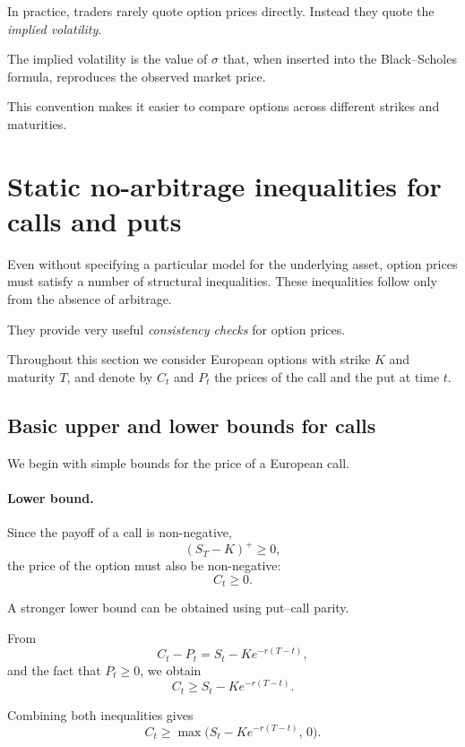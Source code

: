 \documentclass[11pt]{article}
\newcommand{\1}{\mathbf{1}}
\theoremstyle{plain}
\theoremstyle{definition}
\theoremstyle{remark}
\begin{document}
In practice, traders rarely quote option prices directly.
Instead they quote the \emph{implied volatility}.

The implied volatility is the value of \(\sigma\) that, when inserted into
the Black--Scholes formula, reproduces the observed market price.

This convention makes it easier to compare options across different
strikes and maturities.
\section{Static no-arbitrage inequalities for calls and puts}

Even without specifying a particular model for the underlying asset,
option prices must satisfy a number of structural inequalities.
These inequalities follow only from the absence of arbitrage.

They provide very useful \emph{consistency checks} for option prices.

Throughout this section we consider European options with strike \(K\)
and maturity \(T\), and denote by \(C_t\) and \(P_t\) the prices of the
call and the put at time \(t\).

\subsection{Basic upper and lower bounds for calls}

We begin with simple bounds for the price of a European call.

\paragraph{Lower bound.}

Since the payoff of a call is non-negative,
\[
(S_T-K)^+ \ge 0,
\]
the price of the option must also be non-negative:
\[
C_t \ge 0.
\]

A stronger lower bound can be obtained using put--call parity.

From
\[
C_t - P_t = S_t - K e^{-r(T-t)},
\]
and the fact that \(P_t \ge 0\), we obtain
\[
\boxed{
C_t \ge S_t - K e^{-r(T-t)}.
}
\]

Combining both inequalities gives
\[
\boxed{
C_t \ge \max\!\big(S_t-K e^{-r(T-t)},\,0\big).
}
\]
\end{document}
